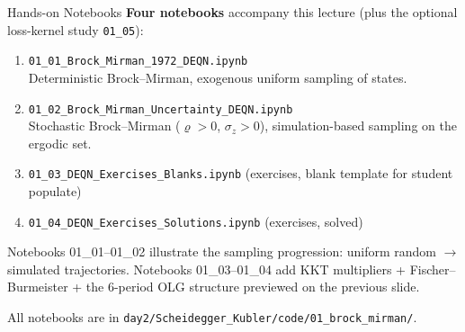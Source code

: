\documentclass[aspectratio=169,11pt]{beamer}
\newcommand{\emphc}[1]{\textcolor{harvardcrimson}{#1}}
\begin{document}
\begin{frame}{Hands-on Notebooks}
\textbf{Four notebooks} accompany this lecture (plus the optional loss-kernel study \texttt{01\_05}):

\vspace{0.4em}
\begin{enumerate}\itemsep2pt
    \item \texttt{01\_01\_Brock\_Mirman\_1972\_DEQN.ipynb}\\
    {\small Deterministic Brock--Mirman, \emphc{exogenous uniform sampling} of states.}

    \item \texttt{01\_02\_Brock\_Mirman\_Uncertainty\_DEQN.ipynb}\\
    {\small Stochastic Brock--Mirman ($\varrho > 0$, $\sigma_z > 0$), \emphc{simulation-based sampling} on the ergodic set.}

    \item \texttt{01\_03\_DEQN\_Exercises\_Blanks.ipynb} (exercises, blank template for student populate)

    \item \texttt{01\_04\_DEQN\_Exercises\_Solutions.ipynb} (exercises, solved)
\end{enumerate}

\vspace{0.3em}
{\footnotesize Notebooks 01\_01--01\_02 illustrate the sampling progression: uniform random $\to$ simulated trajectories.  Notebooks 01\_03--01\_04 add KKT multipliers + Fischer--Burmeister + the 6-period OLG structure previewed on the previous slide.}

\vspace{0.4em}
All notebooks are in \texttt{day2/Scheidegger\_Kubler/code/01\_brock\_mirman/}.
\end{frame}
\end{document}
